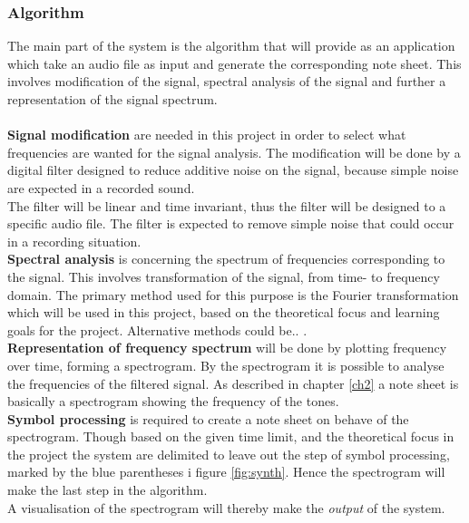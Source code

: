 \subsubsection{Algorithm}
The main part of the system is the algorithm that will provide as an application which take an audio file as input and generate the corresponding note sheet. This involves modification of the signal, spectral analysis of the signal and further a representation of the signal spectrum.\\ \\
\textbf{Signal modification} are needed in this project in order to select what frequencies are wanted for the signal analysis. The modification will be done by a digital filter designed to reduce additive noise on the signal, because simple noise are expected in a recorded sound.\\
The filter will be linear and time invariant, thus the filter will be designed to a specific audio file. The filter is expected to remove simple noise that could occur in a recording situation.              
\\ 
\textbf{Spectral analysis} is concerning the spectrum of frequencies corresponding to the signal. This involves transformation of the signal, from time- to frequency domain.     
The primary method used for this purpose is the Fourier transformation which will be used in this project, based on the theoretical focus and learning goals for the project. Alternative methods could be.. .\\   
\textbf{Representation of frequency spectrum} will be done by plotting frequency over time, forming a spectrogram. By the spectrogram it is possible to analyse the frequencies of the filtered signal. As described in chapter \ref{ch2} a note sheet is basically a spectrogram showing the frequency of the tones.\\  
\textbf{Symbol processing} is required to create a note sheet on behave of the spectrogram. 
Though based on the given time limit, and the theoretical focus in the project the system are delimited to leave out the step of symbol processing, marked by the blue parentheses i figure \ref{fig:synth}. Hence the spectrogram will make the last step in the algorithm. \\
A visualisation of the spectrogram will thereby make the \textit{output} of the system.   

